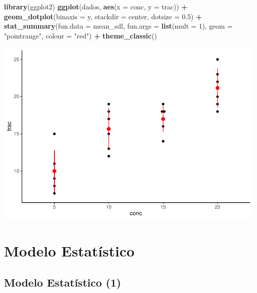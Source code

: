 \documentclass[
]{book}
\newenvironment{Shaded}{\begin{snugshade}}{\end{snugshade}}
\newcommand{\AttributeTok}[1]{\textcolor[rgb]{0.13,0.29,0.53}{#1}}
\newcommand{\DecValTok}[1]{\textcolor[rgb]{0.00,0.00,0.81}{#1}}
\newcommand{\FloatTok}[1]{\textcolor[rgb]{0.00,0.00,0.81}{#1}}
\newcommand{\FunctionTok}[1]{\textcolor[rgb]{0.13,0.29,0.53}{\textbf{#1}}}
\newcommand{\NormalTok}[1]{#1}
\newcommand{\SpecialCharTok}[1]{\textcolor[rgb]{0.81,0.36,0.00}{\textbf{#1}}}
\newcommand{\StringTok}[1]{\textcolor[rgb]{0.31,0.60,0.02}{#1}}
\begin{document}
\begin{Shaded}
\begin{Highlighting}[]
\FunctionTok{library}\NormalTok{(ggplot2)}
\FunctionTok{ggplot}\NormalTok{(dados, }\FunctionTok{aes}\NormalTok{(}\AttributeTok{x =}\NormalTok{ conc, }\AttributeTok{y =}\NormalTok{ trac)) }\SpecialCharTok{+}
  \FunctionTok{geom\_dotplot}\NormalTok{(}\AttributeTok{binaxis =} \StringTok{\textquotesingle{}y\textquotesingle{}}\NormalTok{, }\AttributeTok{stackdir =} \StringTok{\textquotesingle{}center\textquotesingle{}}\NormalTok{, }\AttributeTok{dotsize =} \FloatTok{0.5}\NormalTok{) }\SpecialCharTok{+}
  \FunctionTok{stat\_summary}\NormalTok{(}\AttributeTok{fun.data =}\NormalTok{ mean\_sdl, }\AttributeTok{fun.args =} \FunctionTok{list}\NormalTok{(}\AttributeTok{mult =} \DecValTok{1}\NormalTok{),}
                 \AttributeTok{geom =} \StringTok{"pointrange"}\NormalTok{, }\AttributeTok{colour =} \StringTok{"red"}\NormalTok{) }\SpecialCharTok{+}
    \FunctionTok{theme\_classic}\NormalTok{()}
\end{Highlighting}
\end{Shaded}

\includegraphics{_main_files/figure-latex/dotplot-1.pdf}

\section{Modelo Estatístico}\label{modelo-estatuxedstico}

\subsection{Modelo Estatístico (1)}\label{modelo-estatuxedstico-1}
\end{document}

